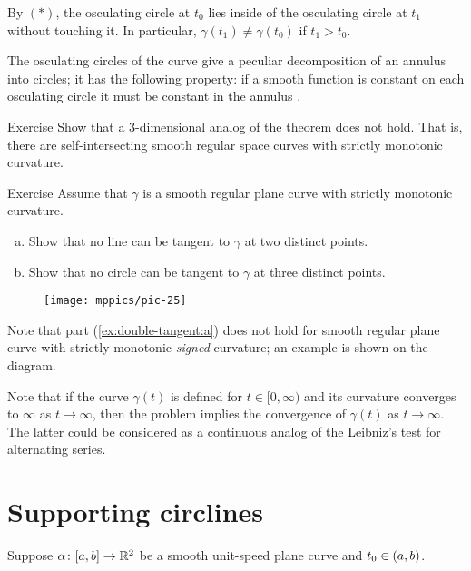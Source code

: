 By $({*})$, the osculating circle at $t_0$ lies inside of the osculating circle at $t_1$ without touching it.
In particular, $\gamma(t_1)\ne \gamma(t_0)$ if $t_1>t_0$.\qeds

The osculating circles of the curve give a peculiar decomposition of an annulus into circles; it has the following property: if a smooth function is constant on each osculating circle it must be constant in the annulus \cite[see][Lecture 10]{fuchs-tabachnikov}.

\begin{thm}{Exercise}
Show that a 3-dimensional analog of the theorem does not hold.
That is, there are self-intersecting smooth regular space curves with strictly monotonic curvature.
\end{thm}

\begin{thm}{Exercise}\label{ex:double-tangent}
Assume that $\gamma$ is a smooth regular plane curve with strictly monotonic curvature.
\begin{enumerate}[(a)]
\item\label{ex:double-tangent:a}Show that no line can be tangent to $\gamma$ at two distinct points.
\item Show that no circle can be tangent to $\gamma$ at three distinct points. 
\end{enumerate}
\end{thm} %

\begin{wrapfigure}{r}{35 mm}
\vskip-0mm
\centering
\texttt{[image: mppics/pic-25]}
\vskip0mm
\end{wrapfigure}

Note that part (\ref{ex:double-tangent:a}) does not hold for smooth regular plane curve with strictly monotonic \emph{signed} curvature; an example is shown on the diagram.

Note that if the curve $\gamma(t)$ is defined for $t\in[0,\infty)$ and its curvature converges to $\infty$ as $t\to \infty$, 
then the problem implies the convergence of $\gamma(t)$ as $t\to\infty$.
The latter could be considered as a continuous analog of the Leibniz's test for alternating series.



\section{Supporting circlines}

Suppose $\alpha\colon[a,b]\to\mathbb{R}^2$ be a smooth unit-speed plane curve and $t_0\z\in(a,b)$.

